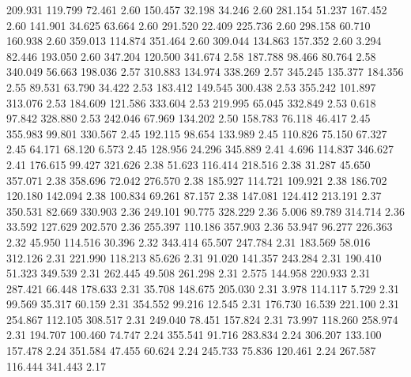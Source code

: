  209.931  119.799   72.461         2.60
 150.457   32.198   34.246         2.60
 281.154   51.237  167.452         2.60
 141.901   34.625   63.664         2.60
 291.520   22.409  225.736         2.60
 298.158   60.710  160.938         2.60
 359.013  114.874  351.464         2.60
 309.044  134.863  157.352         2.60
   3.294   82.446  193.050         2.60
 347.204  120.500  341.674         2.58
 187.788   98.466   80.764         2.58
 340.049   56.663  198.036         2.57
 310.883  134.974  338.269         2.57
 345.245  135.377  184.356         2.55
  89.531   63.790   34.422         2.53
 183.412  149.545  300.438         2.53
 355.242  101.897  313.076         2.53
 184.609  121.586  333.604         2.53
 219.995   65.045  332.849         2.53
   0.618   97.842  328.880         2.53
 242.046   67.969  134.202         2.50
 158.783   76.118   46.417         2.45
 355.983   99.801  330.567         2.45
 192.115   98.654  133.989         2.45
 110.826   75.150   67.327         2.45
  64.171   68.120    6.573         2.45
 128.956   24.296  345.889         2.41
   4.696  114.837  346.627         2.41
 176.615   99.427  321.626         2.38
  51.623  116.414  218.516         2.38
  31.287   45.650  357.071         2.38
 358.696   72.042  276.570         2.38
 185.927  114.721  109.921         2.38
 186.702  120.180  142.094         2.38
 100.834   69.261   87.157         2.38
 147.081  124.412  213.191         2.37
 350.531   82.669  330.903         2.36
 249.101   90.775  328.229         2.36
   5.006   89.789  314.714         2.36
  33.592  127.629  202.570         2.36
 255.397  110.186  357.903         2.36
  53.947   96.277  226.363         2.32
  45.950  114.516   30.396         2.32
 343.414   65.507  247.784         2.31
 183.569   58.016  312.126         2.31
 221.990  118.213   85.626         2.31
  91.020  141.357  243.284         2.31
 190.410   51.323  349.539         2.31
 262.445   49.508  261.298         2.31
   2.575  144.958  220.933         2.31
 287.421   66.448  178.633         2.31
  35.708  148.675  205.030         2.31
   3.978  114.117    5.729         2.31
  99.569   35.317   60.159         2.31
 354.552   99.216   12.545         2.31
 176.730   16.539  221.100         2.31
 254.867  112.105  308.517         2.31
 249.040   78.451  157.824         2.31
  73.997  118.260  258.974         2.31
 194.707  100.460   74.747         2.24
 355.541   91.716  283.834         2.24
 306.207  133.100  157.478         2.24
 351.584   47.455   60.624         2.24
 245.733   75.836  120.461         2.24
 267.587  116.444  341.443         2.17
